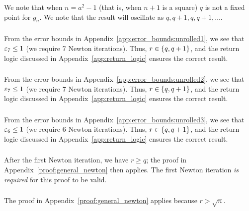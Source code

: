 \noindent
We note that when $n = a^{2} - 1$ (that is, when $n+1$ is a square)
$q$ is not a fixed point for $g_{n}$.
We note that the result will oscillate as $q, q+1, q, q+1, \dots$.

\subsubsection{\UnrolledOne{}}

From the error bounds in Appendix~\ref{app:error_bounds:unrolled1},
we see that $\varepsilon_{7}\le1$ (we require 7 Newton iterations).
Thus, $r\in\left\{ q,q+1 \right\}$, and the return logic
discussed in Appendix~\ref{app:return_logic} ensures the correct result.

\subsubsection{\UnrolledTwo{}}

From the error bounds in Appendix~\ref{app:error_bounds:unrolled2},
we see that $\varepsilon_{7}\le1$ (we require 7 Newton iterations).
Thus, $r\in\left\{ q,q+1 \right\}$, and the return logic
discussed in Appendix~\ref{app:return_logic} ensures the correct result.

\subsubsection{\UnrolledThree{}}

From the error bounds in Appendix~\ref{app:error_bounds:unrolled3},
we see that $\varepsilon_{6}\le1$ (we require 6 Newton iterations).
Thus, $r\in\left\{ q,q+1 \right\}$, and the return logic
discussed in Appendix~\ref{app:return_logic} ensures the correct result.

\subsubsection{\WhileOne{}}

After the first Newton iteration, we have $r\ge q$;
the proof in Appendix~\ref{proof:general_newton} then applies.
The first Newton iteration \emph{is required} for this proof to be valid.

\subsubsection{\WhileTwo{}}

The proof in Appendix~\ref{proof:general_newton} applies
because $r > \sqrt{n}$.

